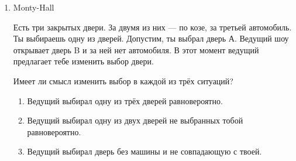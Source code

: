 \documentclass[a4paper, 12pt]{article}
\begin{document}
\begin{enumerate}
\item Monty-Hall

Есть три закрытых двери. За двумя из них — по козе, за третьей автомобиль. Ты выбираешь одну из дверей. Допустим, ты выбрал дверь А. Ведущий шоу открывает дверь B и за ней нет автомобиля.
В этот момент ведущий предлагает тебе изменить выбор двери.

Имеет ли смысл изменить выбор в каждой из трёх ситуаций?
\begin{enumerate}
  \item Ведущий выбирал одну из трёх дверей равновероятно.
  \item Ведущий выбирал одну из двух дверей не выбранных тобой равновероятно.
  \item Ведущий выбирал дверь без машины и не совпадающую с твоей.
\end{enumerate}




\end{enumerate}
\end{document}
